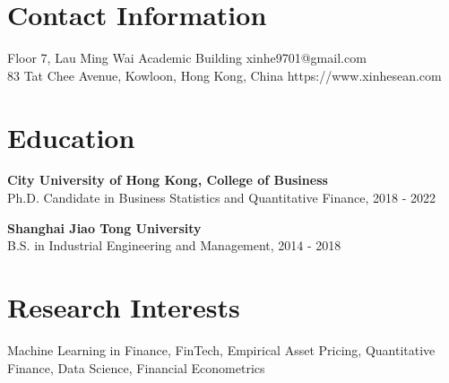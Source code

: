 \documentclass[margin]{res}
\begin{document}
\begin{resume}




\section{\sc Contact Information}
	Floor 7, Lau Ming Wai Academic Building	   \hfill xinhe9701@gmail.com\\        
	83 Tat Chee Avenue, Kowloon, Hong Kong, China 	\hfill   https://www.xinhesean.com \\

\vspace{5mm}

\section{\sc Education}
\textbf{City University of Hong Kong, College of Business}\\
{Ph.D. Candidate in Business Statistics and Quantitative Finance, 2018 - 2022}

\textbf{Shanghai Jiao Tong University}\\
{B.S. in Industrial Engineering and Management, 2014 - 2018}

\vspace{5mm}

\section{\sc Research Interests}
{Machine Learning in Finance, FinTech, Empirical Asset Pricing, Quantitative Finance, Data Science, Financial Econometrics}


\end{resume}
\end{document}
